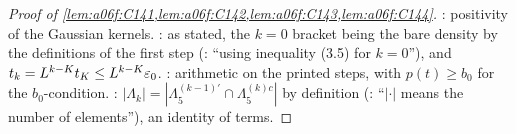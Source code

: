 \begin{proof}[Proof of \cref{lem:a06f:C141,lem:a06f:C142,lem:a06f:C143,lem:a06f:C144}]
: positivity of the Gaussian kernels. : as stated, the $k=0$ bracket being the bare density by the definitions of the first step (\cite[p.~588]{Ba2}: ``using inequality (3.5) for $k=0$''), and $t_k=L^{k-K}t_K\le L^{k-K}\varepsilon_0$. : arithmetic on the printed steps, with $p(t)\ge b_0$ for the $b_0$-condition. : $|\Lambda_k|=|\Lambda^{(k-1)'}_5\cap\Lambda^{(k)c}_5|$ by definition (\cite[p.~592]{Ba2}: ``$|\cdot|$ means the number of elements''), an identity of terms.
\end{proof}
